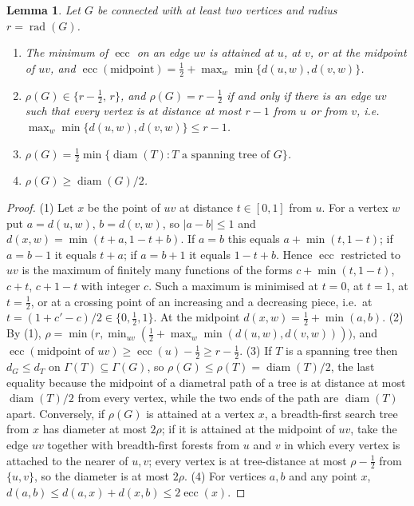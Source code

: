 \documentclass[11pt]{amsart}
\newtheorem{lemma}[theorem]{Lemma}
\theoremstyle{definition}
\newcommand{\rad}{\operatorname{rad}}
\newcommand{\diam}{\operatorname{diam}}
\newcommand{\ecc}{\operatorname{ecc}}
\begin{document}
\begin{lemma}\label{lem:rho-basic}
Let $G$ be connected with at least two vertices and radius $r=\rad(G)$.
\begin{enumerate}[label=(\arabic*)]
\item The minimum of $\ecc$ on an edge $uv$ is attained at $u$, at $v$, or at the midpoint of $uv$, and
      $\ecc(\text{midpoint})=\tfrac12+\max_{w}\min\{d(u,w),d(v,w)\}$.
\item $\rho(G)\in\{r-\tfrac12,\,r\}$, and $\rho(G)=r-\frac12$ if and only if there is an edge $uv$ such that
      every vertex is at distance at most $r-1$ from $u$ or from $v$, i.e.\
      $\max_w\min\{d(u,w),d(v,w)\}\le r-1$.
\item $\rho(G)=\frac12\min\{\diam(T): T \text{ a spanning tree of } G\}$.
\item $\rho(G)\ge \diam(G)/2$.
\end{enumerate}
\end{lemma}
\begin{proof}
(1) Let $x$ be the point of $uv$ at distance $t\in[0,1]$ from $u$. For a vertex $w$ put
$a=d(u,w)$, $b=d(v,w)$, so $|a-b|\le 1$ and $d(x,w)=\min(t+a,1-t+b)$. If $a=b$ this equals
$a+\min(t,1-t)$; if $a=b-1$ it equals $t+a$; if $a=b+1$ it equals $1-t+b$. Hence $\ecc$ restricted to
$uv$ is the maximum of finitely many functions of the forms $c+\min(t,1-t)$, $c+t$, $c+1-t$ with integer
$c$. Such a maximum is minimised at $t=0$, at $t=1$, at $t=\tfrac12$, or at a crossing point of an
increasing and a decreasing piece, i.e.\ at $t=(1+c'-c)/2\in\{0,\frac12,1\}$. At the midpoint
$d(x,w)=\frac12+\min(a,b)$.
(2) By (1), $\rho=\min\bigl(r,\min_{uv}(\frac12+\max_w\min(d(u,w),d(v,w)))\bigr)$, and
$\ecc(\text{midpoint of }uv)\ge \ecc(u)-\frac12\ge r-\frac12$.
(3) If $T$ is a spanning tree then $d_G\le d_T$ on $\Gamma(T)\subseteq\Gamma(G)$, so
$\rho(G)\le\rho(T)=\diam(T)/2$, the last equality because the midpoint of a diametral path of a tree is
at distance at most $\diam(T)/2$ from every vertex, while the two ends of the path are $\diam(T)$ apart.
Conversely, if $\rho(G)$ is attained at a vertex $x$, a breadth-first search tree from $x$ has diameter
at most $2\rho$; if it is attained at the midpoint of $uv$, take the edge $uv$ together with breadth-first
forests from $u$ and $v$ in which every vertex is attached to the nearer of $u,v$; every vertex is at
tree-distance at most $\rho-\frac12$ from $\{u,v\}$, so the diameter is at most $2\rho$.
(4) For vertices $a,b$ and any point $x$, $d(a,b)\le d(a,x)+d(x,b)\le 2\ecc(x)$.
\end{proof}
\end{document}
